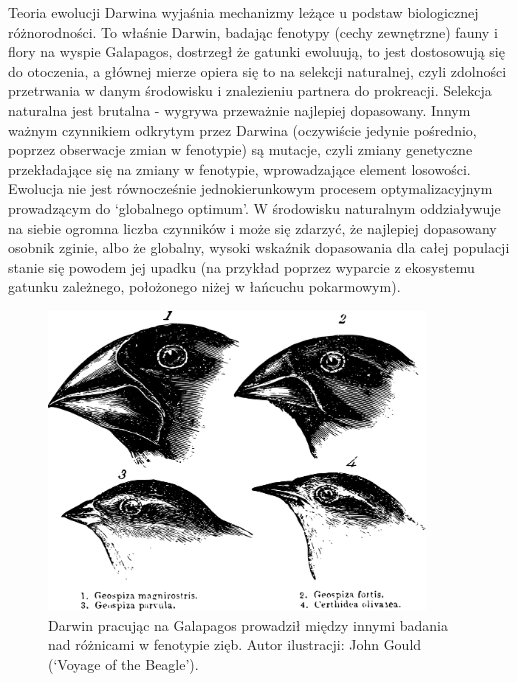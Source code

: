 \documentclass[a4paper,11pt]{article}
\begin{document}
    \bigskip

    Teoria ewolucji Darwina wyjaśnia mechanizmy leżące u podstaw biologicznej różnorodności. To właśnie Darwin, badając fenotypy (cechy zewnętrzne) fauny i flory na wyspie Galapagos, dostrzegł że gatunki ewoluują, to jest dostosowują się do otoczenia, a głównej mierze opiera się to na selekcji naturalnej, czyli zdolności przetrwania w danym środowisku i znalezieniu partnera do prokreacji. Selekcja naturalna jest brutalna - wygrywa przeważnie najlepiej dopasowany. Innym ważnym czynnikiem odkrytym przez Darwina (oczywiście jedynie pośrednio, poprzez obserwacje zmian w fenotypie) są mutacje, czyli zmiany genetyczne przekładające się na zmiany w fenotypie, wprowadzające element losowości. Ewolucja nie jest równocześnie jednokierunkowym procesem optymalizacyjnym prowadzącym do `globalnego optimum'. W środowisku naturalnym oddziaływuje na siebie ogromna liczba czynników i może się zdarzyć, że najlepiej dopasowany osobnik zginie, albo że globalny, wysoki wskaźnik dopasowania dla całej populacji stanie się powodem jej upadku (na przykład poprzez wyparcie z ekosystemu gatunku zależnego, położonego niżej w łańcuchu pokarmowym)\cite{IntroductionToEvolutionaryComputing2015}.

    \bigskip

    \begin{figure}[H]
        \label{fig:darwin_birds}
        \centering
        \includegraphics[width=10cm]{darwin_birds}
        \caption{Darwin pracując na Galapagos prowadził między innymi badania nad różnicami w fenotypie zięb. Autor ilustracji: John Gould (`Voyage of the Beagle').}
    \end{figure}

    \bigskip
\end{document}
